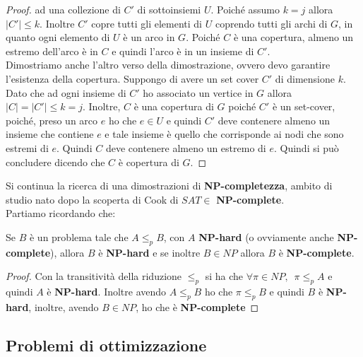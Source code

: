 \begin{proof}
  ad una collezione di $C'$ di sottoinsiemi $U$. Poiché assumo $k=j$ allora
  $|C'|\leq k$. Inoltre $C'$ copre tutti gli elementi di $U$ coprendo tutti gli
  archi di $G$, in quanto ogni elemento di $U$ è un arco in $G$. Poiché $C$ è
  una copertura, almeno un estremo dell’arco è in $C$  e quindi l’arco è in un
  insieme di $C'$.\\
  Dimostriamo anche l'altro verso della dimostrazione, ovvero devo garantire
  l'esistenza della copertura. Suppongo di avere un set cover $C'$ di dimensione
  $k$. Dato che ad ogni insieme di $C'$ ho associato un vertice in $G$ allora
  $|C|=|C'|\leq k=j$. Inoltre, $C$ è una copertura di $G$ poiché $C'$ è un
  set-cover, poiché, preso un arco $e$ ho che $e\in U$ e quindi $C'$ deve
  contenere almeno un insieme che contiene $e$ e tale insieme è quello che
  corrisponde ai nodi che sono estremi di $e$. Quindi $C$ deve contenere almeno
  un estremo di $e$. Quindi si può concludere dicendo che $C$ è copertura di $G$.
\end{proof}
Si continua la ricerca di una dimostrazioni di \textbf{NP-completezza}, ambito
di studio nato dopo la scoperta di Cook di $SAT\in$ \textbf{NP-complete}.\\
Partiamo ricordando che:
\begin{teorema}
  Se $B$ è un problema tale che $A\leq_p B$, con $A$
  \textbf{NP-hard} (o ovviamente anche \textbf{NP-complete}), allora $B$ è
  \textbf{NP-hard} e se inoltre $B\in NP$ allora $B$ è \textbf{NP-complete}.  
\end{teorema}
\begin{proof}
  Con la transitività della riduzione $\leq_p$ si ha che $\forall\pi\in
  NP,\,\,\, \pi\leq_p A$ e quindi $A$ è \textbf{NP-hard}. Inoltre avendo
  $A\leq_p B$ ho che  $\pi\leq_p B$ e quindi $B$ è \textbf{NP-hard}, inoltre,
  avendo $B\in NP$, ho che è \textbf{NP-complete}
\end{proof}


\subsection{Problemi di ottimizzazione}
